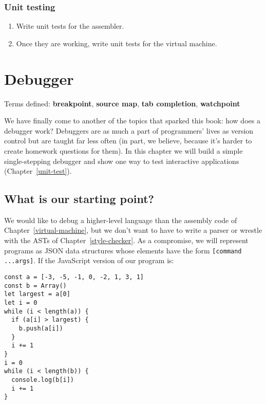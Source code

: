 \documentclass[krantzl]{krantz}
\newcommand{\chapref}[1]{Chapter~\ref{#1}}
\newcommand{\glossref}[1]{\textbf{#1}}
\begin{document}
\subsection*{Unit testing}

\begin{enumerate}

\item 

Write unit tests for the assembler.



\item 

Once they are working,
    write unit tests for the virtual machine.



\end{enumerate}

\chapter{Debugger}\label{debugger}


\noindent 
  Terms defined: \glossref{breakpoint}, \glossref{source map}, \glossref{tab completion}, \glossref{watchpoint}



We have finally come to another of the topics that sparked this book:
how does a debugger work?
Debuggers are as much a part of programmers’ lives as version control
but are taught far less often
(in part, we believe, because it’s harder to create homework questions for them).
In this chapter we will build a simple single-stepping debugger
and show one way to test interactive applications (\chapref{unit-test}).

\section{What is our starting point?}\label{debugger-start}


We would like to debug a higher-level language than the assembly code of \chapref{virtual-machine},
but we don’t want to have to write a parser
or wrestle with the ASTs of \chapref{style-checker}.
As a compromise,
we will represent programs as JSON data structures
whose elements have the form \texttt{[command ...args]}.
If the JavaScript version of our program is:


\begin{lstlisting}[frame=tblr]
const a = [-3, -5, -1, 0, -2, 1, 3, 1]
const b = Array()
let largest = a[0]
let i = 0
while (i < length(a)) {
  if (a[i] > largest) {
    b.push(a[i])
  }
  i += 1
}
i = 0
while (i < length(b)) {
  console.log(b[i])
  i += 1
}
\end{lstlisting}
\end{document}
